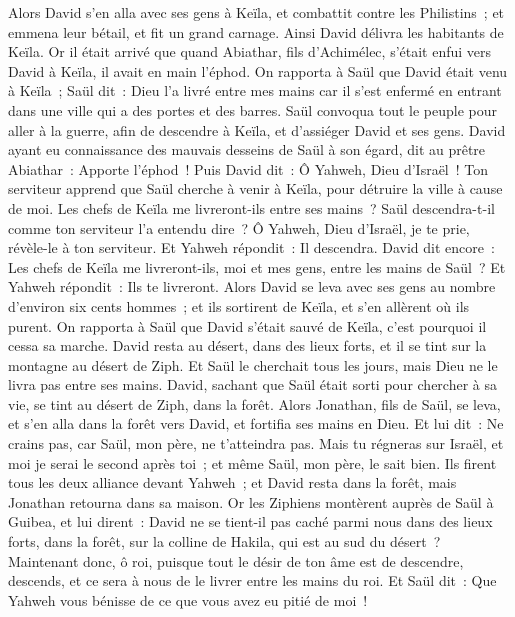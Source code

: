 \begin{multicols}{2}
Alors David s'en alla avec ses gens à Keïla, et combattit contre les Philistins~; et emmena leur bétail, et fit un grand carnage. Ainsi David délivra les habitants de Keïla.
Or il était arrivé que quand Abiathar, fils d'Achimélec, s'était enfui vers David à Keïla, il avait en main l'éphod.
On rapporta à Saül que David était venu à Keïla~; Saül dit~: Dieu l'a livré entre mes mains car il s'est enfermé en entrant dans une ville qui a des portes et des barres.
Saül convoqua tout le peuple pour aller à la guerre, afin de descendre à Keïla, et d'assiéger David et ses gens.
David ayant eu connaissance des mauvais desseins de Saül à son égard, dit au prêtre Abiathar~: Apporte l'éphod~!
Puis David dit~: Ô Yahweh, Dieu d'Israël~! Ton serviteur apprend que Saül cherche à venir à Keïla, pour détruire la ville à cause de moi.
Les chefs de Keïla me livreront-ils entre ses mains~? Saül descendra-t-il comme ton serviteur l'a entendu dire~? Ô Yahweh, Dieu d'Israël, je te prie, révèle-le à ton serviteur. Et Yahweh répondit~: Il descendra.
David dit encore~: Les chefs de Keïla me livreront-ils, moi et mes gens, entre les mains de Saül~? Et Yahweh répondit~: Ils te livreront.
Alors David se leva avec ses gens au nombre d'environ six cents hommes~; et ils sortirent de Keïla, et s'en allèrent où ils purent. On rapporta à Saül que David s'était sauvé de Keïla, c'est pourquoi il cessa sa marche.
David resta au désert, dans des lieux forts, et il se tint sur la montagne au désert de Ziph. Et Saül le cherchait tous les jours, mais Dieu ne le livra pas entre ses mains.
David, sachant que Saül était sorti pour chercher à sa vie, se tint au désert de Ziph, dans la forêt.
Alors Jonathan, fils de Saül, se leva, et s'en alla dans la forêt vers David, et fortifia ses mains en Dieu.
Et lui dit~: Ne crains pas, car Saül, mon père, ne t'atteindra pas. Mais tu régneras sur Israël, et moi je serai le second après toi~; et même Saül, mon père, le sait bien.
Ils firent tous les deux alliance devant Yahweh~; et David resta dans la forêt, mais Jonathan retourna dans sa maison.
Or les Ziphiens montèrent auprès de Saül à Guibea, et lui dirent~: David ne se tient-il pas caché parmi nous dans des lieux forts, dans la forêt, sur la colline de Hakila, qui est au sud du désert~?
Maintenant donc, ô roi, puisque tout le désir de ton âme est de descendre, descends, et ce sera à nous de le livrer entre les mains du roi.
Et Saül dit~: Que Yahweh vous bénisse de ce que vous avez eu pitié de moi~!

\end{multicols}
